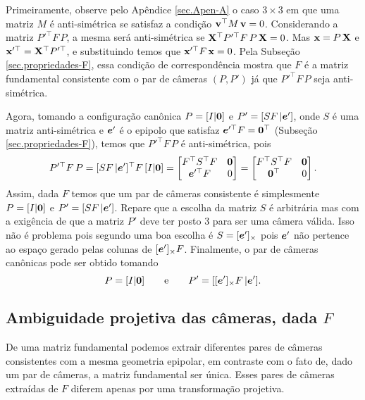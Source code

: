 Primeiramente, observe pelo Apêndice \ref{sec.Apen-A} o caso $3\times3$ em que uma matriz $M$ é anti-simétrica se satisfaz a condição ${\bf v}^\top M\,{\bf v}=0$. Considerando a matriz $P'^\top F\,P$, a mesma será anti-simétrica se $\mathbf{X}^\top P'^\top F\,P\,\mathbf{X}=0$. Mas $\mathbf{x}=P\,\mathbf{X}$ e $\mathbf{x}'^\top=\mathbf{X}^\top P'^\top$, e substituindo temos que $\mathbf{x}'^\top F\,\mathbf{x}=0$. Pela Subseção \ref{sec.propriedades-F}, essa condição de correspondência mostra que $F$ é a matriz fundamental consistente com o par de câmeras $(P,P')$ já que $P'^\top F\,P$ seja anti-simétrica.

Agora, tomando a configuração canônica $P=[I|{\bf 0}]$ e $P'=[SF\,|\boldsymbol{e}']$, onde $S$ é uma matriz anti-simétrica e $\boldsymbol{e}'$ é o epipolo que satisfaz $\boldsymbol{e}'^\top F={\bf 0}^\top$ (Subseção \ref{sec.propriedades-F}), temos que $P'^\top F\,P$ é anti-simétrica, pois
\begin{equation*}
P'^\top F\,P=[SF\,|\boldsymbol{e}']^\top F\,[I|{\bf 0}]=
\begin{bmatrix}
F^\top S^\top F&{\bf 0}\\
\boldsymbol{e}'^\top F&0
\end{bmatrix}=
\begin{bmatrix}
F^\top S^\top F&{\bf 0}\\
{\bf 0}^\top&0
\end{bmatrix}.
\end{equation*}
Assim, dada $F$ temos que um par de câmeras consistente é simplesmente $P=[I|{\bf 0}]$ e $P'=[SF\,|\boldsymbol{e}']$. Repare que a escolha da matriz $S$ é arbitrária mas com a exigência de que a matriz $P'$ deve ter posto 3 para ser uma câmera válida. Isso não é problema pois segundo \cite{luong} uma boa escolha é $S=[\boldsymbol{e}']_\times$ pois $\boldsymbol{e}'$ não pertence ao espaço gerado pelas colunas de $[\boldsymbol{e}']_\times F$. Finalmente, o par de câmeras canônicas pode ser obtido tomando 
\begin{equation}\label{eq.cameras-dada-F}
P=[I|{\bf 0}]\qquad\text{e}\qquad P'=[[\boldsymbol{e}']_\times F\,|\boldsymbol{e}'].
\end{equation}
\subsection{Ambiguidade projetiva das câmeras, dada $F$}\label{sec.ambi-cameras-dada-F}

De uma matriz fundamental podemos extrair diferentes pares de câmeras consistentes com a mesma geometria epipolar, em contraste com o fato de, dado um par de câmeras, a matriz fundamental ser única. Esses pares de câmeras extraídas de $F$ diferem apenas por uma transformação projetiva.

